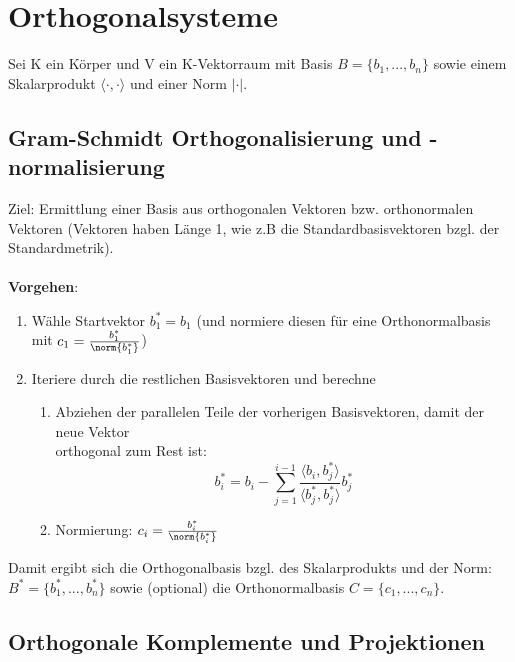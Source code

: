 \section{Orthogonalsysteme}%
\label{os:sec:orthogonalsysteme}

Sei K ein Körper und V ein K-Vektorraum mit Basis $B = \{b_1, ..., b_n\}$ sowie einem Skalarprodukt $\langle \cdot, \cdot\rangle$ und einer Norm $|\cdot|$.

\subsection{Gram-Schmidt Orthogonalisierung und -normalisierung}%
\label{os:sub:gram_schmidt_orthogonalisierung_und_normalisierung}

Ziel: Ermittlung einer Basis aus orthogonalen Vektoren bzw. orthonormalen Vektoren (Vektoren haben Länge 1, wie z.B die Standardbasisvektoren bzgl. der Standardmetrik).\\\\
\textbf{Vorgehen}:
\begin{enumerate}
	\item Wähle Startvektor $b^*_1 = b_1$ (und normiere diesen für eine Orthonormalbasis mit $c_1 =  \frac{b^*_1}{\norm{b^*_1}}$)
	\item Iteriere durch die restlichen Basisvektoren und berechne
	\begin{enumerate}
		\item Abziehen der parallelen Teile der vorherigen Basisvektoren, damit der neue Vektor\\orthogonal zum Rest ist: $$b^*_i = b_i - \sum_{j = 1}^{i - 1} \frac{\langle b_i, b^*_j\rangle}{\langle b^*_j, b^*_j\rangle}b^*_j$$\vspace*{-0.6cm}
		\item Normierung: $c_i = \frac{b^*_i}{\norm{b^*_i}}$
	\end{enumerate}
\end{enumerate}
Damit ergibt sich die Orthogonalbasis bzgl. des Skalarprodukts und der Norm: $B^* = \{b^*_1, ..., b^*_n\}$ sowie (optional) die Orthonormalbasis $C = \{c_1, ..., c_n\}$.

\subsection{Orthogonale Komplemente und Projektionen}%
\label{os:sub:orthogonale_komplemente_und_projektionen}

